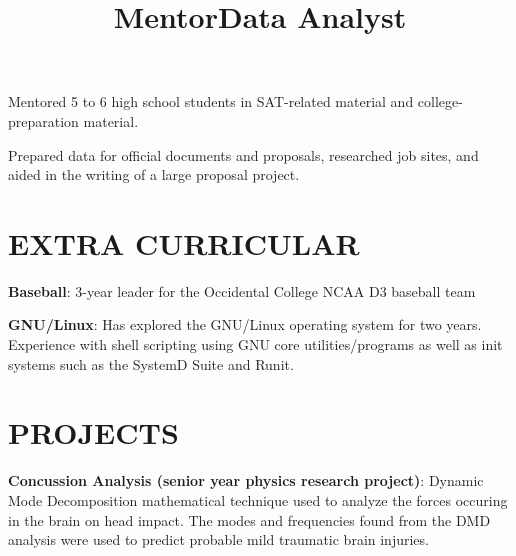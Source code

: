 \documentclass[margin]{res}
\begin{document}
\begin{resume}
\title{\textbf{Mentor}}
\begin{position}
	Mentored 5 to 6 high school students in SAT-related material and college-preparation material.
\end{position}

\title{\textbf{Data Analyst}}
\begin{position}
	Prepared data for official documents and proposals, researched job sites, and aided in the writing of a large proposal project.
\end{position}

\section{EXTRA CURRICULAR}
\par
\textbf{Baseball}: 3-year leader for the Occidental College NCAA D3 baseball team
\par
\textbf{GNU/Linux}: Has explored the GNU/Linux operating system for two years. Experience with shell scripting using GNU core utilities/programs as well as init systems such as the SystemD Suite and Runit.

\section{PROJECTS}
\par
\textbf{Concussion Analysis (senior year physics research project)}: 
Dynamic Mode Decomposition mathematical technique used to analyze the forces occuring in the brain on head impact. The modes and frequencies found from the DMD analysis were used to predict probable mild traumatic brain injuries.


\end{resume}
\end{document}
